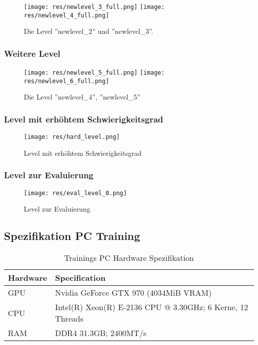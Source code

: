 \documentclass[11pt]{scrartcl}
\begin{document}
\begin{figure}[htp]
\centering
\texttt{[image: res/newlevel\_3\_full.png]}
\texttt{[image: res/newlevel\_4\_full.png]}

\caption{
  Die Level ''newlevel\_2'' und ''newlevel\_3''.
        }
\end{figure}

\newpage
\subsubsection{Weitere Level}
\label{sec:six_levels}

\begin{figure}[h]
\centering
\texttt{[image: res/newlevel\_5\_full.png]}
\texttt{[image: res/newlevel\_6\_full.png]}

\caption{
  Die Level ''newlevel\_4'', ''newlevel\_5''}
\end{figure}


\subsubsection{Level mit erhöhtem Schwierigkeitsgrad}
\label{sec:hard_level_appendix}

\begin{figure}[htp]
\centering
\texttt{[image: res/hard\_level.png]}

\caption{Level mit erhöhtem Schwierigkeitsgrad}
\end{figure}

\subsubsection{Level zur Evaluierung}
\label{sec:untrained_level_appendix}

\begin{figure}[htp]
\centering
\texttt{[image: res/eval\_level\_0.png]}

\caption{Level zur Evaluierung}
\end{figure}

\newpage
\subsection{Spezifikation PC Training}
\label{sec:specs}
\begin{table}[ht]
  \begin{center}
    \begin{tabular}{l | l}
      \textbf{Hardware} & \textbf{Specification} \\
      \hline
      GPU & Nvidia GeForce GTX 970 (4034MiB VRAM)\\
      CPU & Intel(R) Xeon(R) E-2136 CPU @ 3.30GHz; 6 Kerne, 12 Threads\\
      RAM & DDR4 31.3GB; 2400MT/s
    \end{tabular}

    \caption[PC Specifikation]{Trainings PC Hardware Spezifikation}
    \label{tab:pc_specs}
  \end{center}
\end{table}
\end{document}
